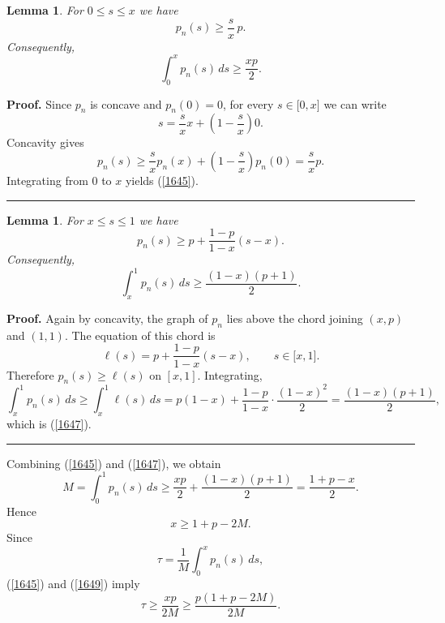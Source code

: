\documentclass[onecolumn]{article}
\newtheorem{lemma}[theorem]{Lemma}
\newenvironment{proof}[1][Proof]{\noindent\textbf{#1.} }{\ \rule{0.5em}{0.5em}}
\begin{document}
\begin{lemma}
\label{concavity-left} For $0\leq s\leq x$ we have 
\begin{equation}
p_{n}(s)\geq \frac{s}{x}\,p.  \label{1644}
\end{equation}%
Consequently, 
\begin{equation}
\int_{0}^{x}p_{n}(s)\,ds\geq \frac{xp}{2}.  \label{1645}
\end{equation}
\end{lemma}

\begin{proof}
\noindent Since $p_{n}$ is concave and $p_{n}(0)=0$, for every $s\in \lbrack
0,x]$ we can write 
\begin{equation*}
s=\frac{s}{x}x+\left( 1-\frac{s}{x}\right) 0.
\end{equation*}%
Concavity gives 
\begin{equation*}
p_{n}(s)\geq \frac{s}{x}p_{n}(x)+\left( 1-\frac{s}{x}\right) p_{n}(0)=\frac{s%
}{x}p.
\end{equation*}%
Integrating from $0$ to $x$ yields (\ref{1645}). \hfill
\end{proof}

\begin{lemma}
\label{concavity-right} For $x\leq s\leq 1$ we have 
\begin{equation}
p_{n}(s)\geq p+\frac{1-p}{1-x}(s-x).  \label{1646}
\end{equation}%
Consequently, 
\begin{equation}
\int_{x}^{1}p_{n}(s)\,ds\geq \frac{(1-x)(p+1)}{2}.  \label{1647}
\end{equation}
\end{lemma}

\begin{proof}
Again by concavity, the graph of $p_{n}$ lies above the chord joining $(x,p)$
and $(1,1)$. The equation of this chord is 
\begin{equation*}
\ell (s)=p+\frac{1-p}{1-x}(s-x),\qquad s\in \lbrack x,1].
\end{equation*}%
Therefore $p_{n}(s)\geq \ell (s)$ on $[x,1]$. Integrating, 
\begin{equation*}
\int_{x}^{1}p_{n}(s)\,ds\geq \int_{x}^{1}\ell (s)\,ds=p(1-x)+\frac{1-p}{1-x}%
\cdot \frac{(1-x)^{2}}{2}=\frac{(1-x)(p+1)}{2},
\end{equation*}%
which is (\ref{1647}). \hfill
\end{proof}

Combining (\ref{1645}) and (\ref{1647}), we obtain 
\begin{equation}
M=\int_{0}^{1}p_{n}(s)\,ds\geq \frac{xp}{2}+\frac{(1-x)(p+1)}{2}=\frac{1+p-x%
}{2}.  \label{1648}
\end{equation}%
Hence 
\begin{equation}
x\geq 1+p-2M.  \label{1649}
\end{equation}%
Since 
\begin{equation}
\tau =\frac{1}{M}\int_{0}^{x}p_{n}(s)\,ds,  \label{1650}
\end{equation}%
(\ref{1645}) and (\ref{1649}) imply 
\begin{equation}
\tau \geq \frac{xp}{2M}\geq \frac{p(1+p-2M)}{2M}.  \label{1651}
\end{equation}
\end{document}
